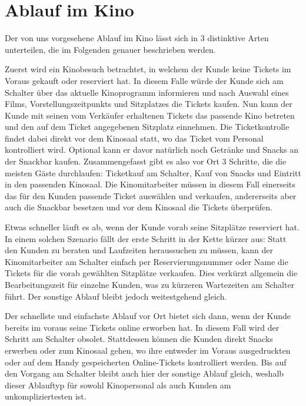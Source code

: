 \section{Ablauf im Kino}

Der von uns vorgesehene Ablauf im Kino lässt sich in 3 distinktive Arten unterteilen, die im Folgenden genauer beschrieben werden.


Zuerst wird ein Kinobesuch betrachtet, in welchem der Kunde keine Tickets im Voraus gekauft oder reserviert hat.
In diesem Falle würde der Kunde sich am Schalter über das aktuelle Kinoprogramm informieren und nach Auswahl eines Films, Vorstellungszeitpunkts und Sitzplatzes die Tickets kaufen.
Nun kann der Kunde mit seinen vom Verkäufer erhaltenen Tickets das passende Kino betreten und den auf dem Ticket angegebenen Sitzplatz einnehmen.
Die Ticketkontrolle findet dabei direkt vor dem Kinosaal statt, wo das Ticket vom Personal kontrolliert wird.
Optional kann er davor natürlich noch Getränke und Snacks an der Snackbar kaufen. 
Zusammengefasst gibt es also vor Ort 3 Schritte, die die meisten Gäste durchlaufen:
Ticketkauf am Schalter, Kauf von Snacks und Eintritt in den passenden Kinosaal.
Die Kinomitarbeiter müssen in diesem Fall einerseits das für den Kunden passende Ticket auswählen und verkaufen, andererseits aber auch die Snackbar besetzen und vor dem Kinosaal die Tickets überprüfen.


Etwas schneller läuft es ab, wenn der Kunde vorab seine Sitzplätze reserviert hat.
In einem solchen Szenario fällt der erste Schritt in der Kette kürzer aus:
Statt den Kunden zu beraten und Laufzeiten heraussuchen zu müssen, kann der Kinomitarbeiter am Schalter einfach per Reservierungsnummer oder Name die Tickets für die vorab gewählten Sitzplätze verkaufen.
Dies verkürzt allgemein die Bearbeitungszeit für einzelne Kunden, was zu kürzeren Wartezeiten am Schalter führt.
Der sonstige Ablauf bleibt jedoch weitestgehend gleich.


Der schnellste und einfachste Ablauf vor Ort bietet sich dann, wenn der Kunde bereits im voraus seine Tickets online erworben hat.
In diesem Fall wird der Schritt am Schalter obsolet.
Stattdessen können die Kunden direkt Snacks erwerben oder zum Kinosaal gehen, wo ihre entweder im Voraus ausgedruckten oder auf dem Handy gespeicherten Online-Tickets kontrolliert werden.
Bis auf den Vorgang am Schalter bleibt auch hier der sonstige Ablauf gleich, weshalb dieser Ablauftyp für sowohl Kinopersonal als auch Kunden am unkompliziertesten ist.